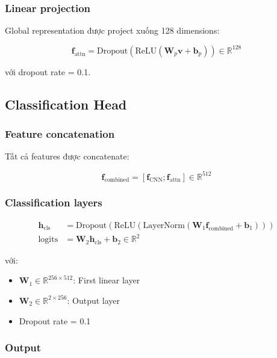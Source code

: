 \subsubsection{Linear projection}

Global representation được project xuống 128 dimensions:

\begin{equation}
\mathbf{f}_{\text{attn}} = \text{Dropout}(\text{ReLU}(\mathbf{W}_p \mathbf{v} + \mathbf{b}_p)) \in \mathbb{R}^{128}
\end{equation}

với dropout rate = 0.1.

\subsection{Classification Head}

\subsubsection{Feature concatenation}

Tất cả features được concatenate:

\begin{equation}
\mathbf{f}_{\text{combined}} = [\mathbf{f}_{\text{CNN}}; \mathbf{f}_{\text{attn}}] \in \mathbb{R}^{512}
\end{equation}

\subsubsection{Classification layers}

\begin{align}
\mathbf{h}_{\text{cls}} &= \text{Dropout}(\text{ReLU}(\text{LayerNorm}(\mathbf{W}_1 \mathbf{f}_{\text{combined}} + \mathbf{b}_1))) \\
\text{logits} &= \mathbf{W}_2 \mathbf{h}_{\text{cls}} + \mathbf{b}_2 \in \mathbb{R}^{2}
\end{align}

với:
\begin{itemize}
    \item $\mathbf{W}_1 \in \mathbb{R}^{256 \times 512}$: First linear layer
    \item $\mathbf{W}_2 \in \mathbb{R}^{2 \times 256}$: Output layer
    \item Dropout rate = 0.1
\end{itemize}

\subsubsection{Output}

